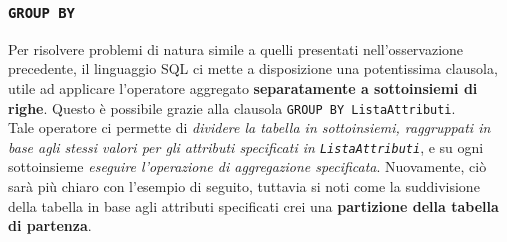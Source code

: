 \documentclass[12pt]{report}
\begin{document}
	\subsubsection*{\texttt{GROUP BY}}
	Per risolvere problemi di natura simile a quelli presentati nell'osservazione precedente, il linguaggio SQL ci mette a disposizione una potentissima clausola, utile ad applicare l'operatore aggregato \textbf{separatamente a sottoinsiemi di righe}. Questo è possibile grazie alla clausola \texttt{GROUP BY ListaAttributi}.\\
	Tale operatore ci permette di \textit{dividere la tabella in sottoinsiemi, raggruppati in base agli stessi valori per gli attributi specificati in \texttt{ListaAttributi}}, e su ogni sottoinsieme \textit{eseguire l'operazione di aggregazione specificata}. Nuovamente, ciò sarà più chiaro con l'esempio di seguito, tuttavia si noti come la suddivisione della tabella in base agli attributi specificati crei una \textbf{partizione della tabella di partenza}.
	
\end{document}
